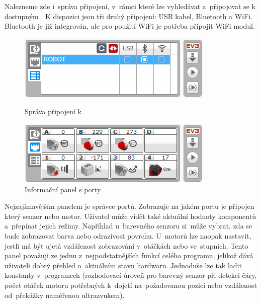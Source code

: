 Nalezneme zde i~správa připojení, v~rámci které lze vyhledávat a~připojovat se k dostupným . 
K dispozici jsou tři druhý připojení: USB kabel, Bluetooth a WiFi. Bluetooth je již integrován, ale pro použití WiFi je potřeba připojit WiFi modul.

\begin{figure}[h]
	\begin{minipage}[b]{.48\textwidth}
		\centering
		\includegraphics[width=\textwidth]{images/lego-soft_brick-manager_connected.png}
		\caption{Správa připojení k }
		\label{fig:lego-soft_brick-manager-connected}
	\end{minipage}
	\hfill
	\begin{minipage}[b]{.48\textwidth}
		\centering
		\includegraphics[width=\textwidth]{images/lego-soft_brick_port-view.png}
		\caption{Informační panel s porty}
		\label{fig:lego-soft_brick_port-view}
	\end{minipage}
\end{figure}

Nejzajímavějším panelem je správce portů. 
Zobrazuje na jakém portu je připojen který senzor nebo motor. 
Uživatel může vidět také aktuální hodnoty komponentů a~přepínat jejich režimy.    
Například u~barevného senzoru si~může vybrat, zda se bude zobrazovat barva nebo odrazivost povrchu. U~motorů lze naopak nastavit, jestli má být ujetá vzdálenost zobrazování v~otáčkách nebo ve~stupních. 
Tento panel považuji ze jednu z~nejpodstatnějších funkcí celého programu, jelikož dává uživateli dobrý přehled o~aktuálním stavu hardwaru. 
Jednoduše lze tak ladit konstanty v~programech (rozhodovací úroveň pro barevný senzor při detekci čáry, počet otáček motoru potřebných k~dojetí na~požadovanou pozici nebo vzdálenost od~překážky naměřenou ultrazvukem). 


